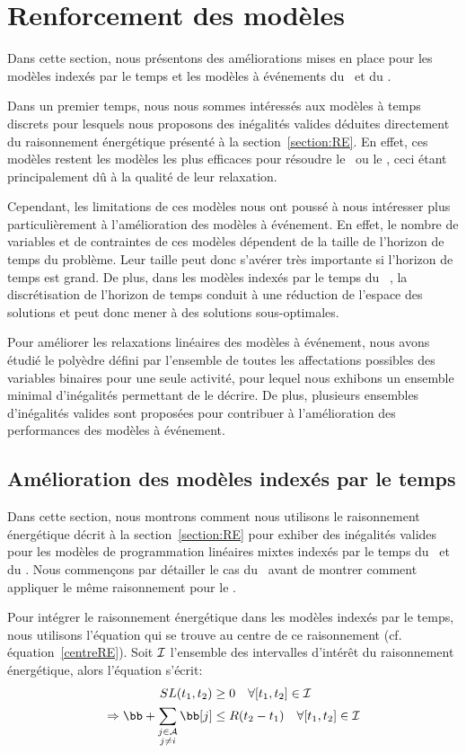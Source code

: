 \section{Renforcement des modèles}

Dans cette section, nous présentons des améliorations mises en place
pour les modèles indexés par le temps et les modèles à événements du
\RCPSP~et du \CECSP. 

Dans un premier temps, nous nous sommes intéressés aux modèles à temps
discrets pour lesquels nous proposons des inégalités valides déduites
directement du raisonnement énergétique présenté à la
section~\ref{section:RE}. En effet, ces modèles restent les modèles
les plus efficaces pour résoudre le \CECSP~ou le \RCPSP, ceci étant
principalement dû à la qualité de leur relaxation. 

Cependant, les limitations de ces modèles nous ont poussé à nous
intéresser plus particulièrement à l'amélioration des modèles à
événement. En effet, le nombre de variables et de contraintes de ces
modèles dépendent de la taille de l'horizon de temps du problème. Leur
taille peut donc s'avérer très importante si l'horizon de temps est grand.
De plus, dans les modèles indexés par le temps du \CECSP~, la
discrétisation de l'horizon de temps conduit à une réduction de
l'espace des solutions et peut donc mener à des solutions
sous-optimales. 

Pour améliorer les relaxations linéaires des modèles à événement, nous
avons étudié le polyèdre défini par l'ensemble de toutes les
affectations possibles des variables binaires pour une seule
activité, pour lequel nous exhibons un ensemble minimal d'inégalités
permettant de le décrire. De plus, plusieurs ensembles d'inégalités valides
sont proposées pour contribuer à l'amélioration des performances des
modèles à événement.
 
\subsection{Amélioration des modèles indexés par le temps}

Dans cette section, nous montrons comment nous utilisons le
raisonnement énergétique décrit à la section~\ref{section:RE} pour
exhiber des inégalités valides pour les modèles de programmation
linéaires mixtes indexés par le temps du \RCPSP~et du \CECSP. Nous
commençons par détailler le cas du \CECSP~avant de montrer comment
appliquer le même raisonnement pour le \RCPSP.

Pour intégrer le raisonnement énergétique dans les modèles indexés par
le temps, nous utilisons l'équation qui se trouve au centre de ce
raisonnement (cf. équation~\ref{centreRE}). Soit ${\cal I}$ l'ensemble des
intervalles d'intérêt du raisonnement énergétique, alors l'équation
s'écrit:  
\begin{align} 
  SL(t_1,t_2) &\ge 0 \quad \forall [t_1,t_2] \in \I \nonumber\\
  \Rightarrow \bb + \sum_{\substack{j\in \A\\j\neq i}}\bb[j] &\le
  R(t_2-t_1)\quad \forall [t_1,t_2] \in \I \nonumber
\end{align}  

